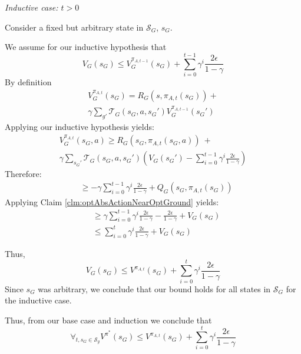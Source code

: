 \textit{Inductive case: $t > 0$}

Consider a fixed but arbitrary state in $\mathcal{S}_G$, $s_G$.

We assume for our inductive hypothesis that
\begin{equation}
V_G(s_G) \leq V_G^{\pi_{A,t-1}}(s_G)  + \sum_{i=0}^{t-1}\gamma^i \frac{2\epsilon}{1-\gamma}
\end{equation}
By definition 
\begin{multline*}
V_G^{\pi_{A,t}}(s_G) = R_G(s, \pi_{A,t}(s_G)) + \\ \gamma \sum_{g'}\mathcal{T}_G(s_G, a, {s_G}')V_G^{\pi_{A,t-1}}({s_G}')
\end{multline*}
Applying our inductive hypothesis yields:
\begin{multline*}
V_G^{\pi_{A,t}}(s_G, a) \geq R_G(s_G, \pi_{A,t}(s_G, a))\ + \\ \gamma \sum_{{s_G}'}\mathcal{T}_G(s_G, a, {s_G}')\left(V_G({s_G}') - \sum_{i=0}^{t-1}\gamma^i \frac{2\epsilon}{1-\gamma} \right)
\end{multline*}
Therefore:
\begin{align*}
&\geq -\gamma\sum_{i=0}^{t-1}\gamma^i \frac{2\epsilon}{1-\gamma} + Q_G(s_G, \pi_{A,t} (s_G))
\end{align*}
Applying Claim \ref{clm:optAbsActionNearOptGround} yields:
\begin{align*}
&\geq \gamma\sum_{i=0}^{t-1}\gamma^i \frac{2\epsilon}{1-\gamma} - \frac{2\epsilon}{1-\gamma} + V_{G}(s_G)\\
&\leq \sum_{i=0}^{t}\gamma^i \frac{2\epsilon}{1-\gamma} + V_G(s_G)
\end{align*}

Thus,
\begin{equation*}
V_G(s_G) \leq V^{\pi_{A,t}}(s_G)  + \sum_{i=0}^{t}\gamma^i \frac{2\epsilon}{1-\gamma}
\end{equation*}
Since $s_G$ was arbitrary, we conclude that our bound holds for all states in $\mathcal{S}_G$ for the inductive case.

Thus, from our base case and induction we conclude that
\begin{equation}
\forall_{t, s_G \in \mathcal{S}_g} V^{\pi^*}(s_G) \leq  V^{\pi_{A,t}}(s_G) + \sum_{i=0}^{t}\gamma^i \frac{2\epsilon}{1-\gamma}
\end{equation}

